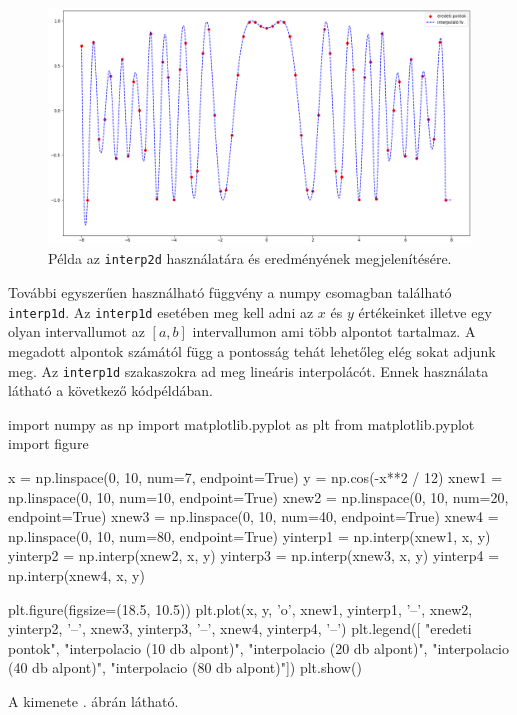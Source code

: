 \begin{figure}[h!]
\centering
\includegraphics[width=\textwidth]{img/cubic.png}
\caption{Példa az \texttt{interp2d} használatára és eredményének megjelenítésére.}
\label{fig:cubic}
\end{figure}
    
    További egyszerűen használható függvény a numpy csomagban található
\texttt{interp1d}. Az \texttt{interp1d} esetében meg kell adni az \(x\)
és \(y\) értékeinket illetve egy olyan intervallumot az \([a, b]\)
intervallumon ami több alpontot tartalmaz. A megadott alpontok számától
függ a pontosság tehát lehetőleg elég sokat adjunk meg. Az
\texttt{interp1d} szakaszokra ad meg lineáris interpolácót. Ennek használata látható a következő kódpéldában.
\begin{python}
import numpy as np
import matplotlib.pyplot as plt
from matplotlib.pyplot import figure

x = np.linspace(0, 10, num=7, endpoint=True)
y = np.cos(-x**2 / 12)
xnew1 = np.linspace(0, 10, num=10, endpoint=True)
xnew2 = np.linspace(0, 10, num=20, endpoint=True)
xnew3 = np.linspace(0, 10, num=40, endpoint=True)
xnew4 = np.linspace(0, 10, num=80, endpoint=True)
yinterp1 = np.interp(xnew1, x, y)
yinterp2 = np.interp(xnew2, x, y)
yinterp3 = np.interp(xnew3, x, y)
yinterp4 = np.interp(xnew4, x, y)

plt.figure(figsize=(18.5, 10.5))
plt.plot(x, y, 'o',
    xnew1, yinterp1, '--',
    xnew2, yinterp2, '--',
    xnew3, yinterp3, '--',
    xnew4, yinterp4, '--')
plt.legend([
    "eredeti pontok",
    "interpolacio (10 db alpont)",
    "interpolacio (20 db alpont)",
    "interpolacio (40 db alpont)", 
    "interpolacio (80 db alpont)"])
plt.show()
\end{python}
A kimenete . ábrán látható.

